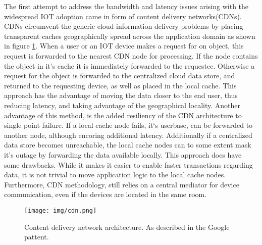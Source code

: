 The first attempt to address the bandwidth and latency issues arising with the widespread IOT adoption came in form of content delivery networks(CDNs).\cite{gagliardi2011content} CDNs circumvent the generic cloud information delivery problems by placing transparent caches geographically spread across the application domain as shown in figure \ref{lit:fig:2}. When a user or an IOT device makes a request for on object, this request is forwarded to the nearest CDN node for processing. If the node contains the object in it's cache it is immediately forwarded to the requestee. Otherwise a request for the object is forwarded to the centralized cloud data store, and returned to the requesting device, as well as placed in the local cache. This approach has the advantage of moving the data closer to the end user, thus reducing latency, and taking advantage of the geographical locality. Another advantage of this method, is the added resiliency of the CDN architecture to single point failure. If a local cache node fails, it`s userbase, can be forwarded to another node, although encoring additional latency. Additionally if a centralized data store becomes unreachable, the local cache nodes can to some extent mask it's outage by forwarding the data available locally. This approach does have some drawbacks. While it makes it easier to enable faster transactions regarding data, it is not trivial to move application logic to the local cache nodes. Furthermore, CDN methodology, still relies on a central mediator for device communication, even if the devices are located in the same room. 

\begin{figure}[h]
	\centering
	\texttt{[image: img/cdn.png]}	
	\caption{Content delivery network architecture. As described in the Google pattent.\cite{gagliardi2011content}}
	\label{lit:fig:2}
\end{figure}

